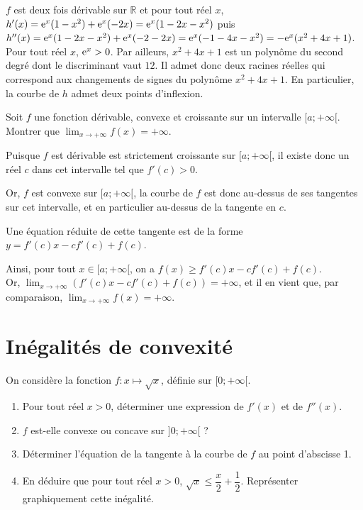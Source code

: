 \documentclass[11pt,fleqn, openany]{book} %
\begin{document}
\begin{solution}$f$ est deux fois dérivable sur $\mathbb{R}$ et pour tout réel $x$, $h'(x)=\mathrm{e}^x(1-x^2)+\mathrm{e}^x(-2x)=\mathrm{e}^x(1-2x-x^2)$ puis $h''(x)=\mathrm{e}^x(1-2x-x^2)+\mathrm{e}^x(-2-2x)=\mathrm{e}^x(-1-4x-x^2)=-\mathrm{e}^x(x^2+4x+1)$. Pour tout réel $x$, $\mathrm{e}^x>0$. Par ailleurs, $x^2+4x+1$ est un polynôme du second degré dont le discriminant vaut $12$. Il admet donc deux racines réelles qui correspond aux changements de signes du polynôme $x^2+4x+1$. En particulier, la courbe de $h$ admet deux points d'inflexion.\end{solution}



\begin{exercise}[topic=cvx02]Soit $f$ une fonction dérivable, convexe et croissante sur un intervalle $[a;+\infty[$. \\Montrer que $\displaystyle\lim_{x \to + \infty}f(x)=+\infty$.\newpage \end{exercise}

\begin{solution}
Puisque \(f\) est dérivable est strictement croissante sur \([a;+\infty[\), il existe donc un réel \(c\) dans cet intervalle tel que \(f'(c)>0\).

 Or, \(f\) est convexe sur \([a;+\infty[\), la courbe de \(f\) est donc au-dessus de ses tangentes sur cet intervalle, et en particulier au-dessus de la tangente en \(c\). 

 Une équation réduite de cette tangente est de la forme \(y = f'(c)x -cf'(c)+f(c)\). 

 Ainsi, pour tout \(x \in [a;+\infty[\), on a \(f(x) \geqslant f'(c)x -cf'(c)+f(c)\). \\Or, \(\displaystyle\lim_{x\to +\infty}(f'(c)x -cf'(c)+f(c))=+\infty\), et il en vient que, par comparaison, \(\displaystyle\lim_{x \to + \infty}f(x)=+\infty\).\end{solution}
 
 
 
\section*{Inégalités de convexité}

\begin{exercise}[topic=cvx03]On considère la fonction $f:x\mapsto \sqrt{x}$, définie sur $[0;+\infty [$.
\begin{enumerate}
\item Pour tout réel $x>0$, déterminer une expression de $f'(x)$ et de $f''(x)$.
\item $f$ est-elle convexe ou concave sur $]0;+\infty[$ ?
\item Déterminer l'équation de la tangente à la courbe de $f$ au point d'abscisse 1.
\item En déduire que pour tout réel $x>0$, $\sqrt{x} \leqslant \dfrac{x}{2}+\dfrac{1}{2}$. Représenter graphiquement cette inégalité.
\end{enumerate}\end{exercise}
\end{document}

